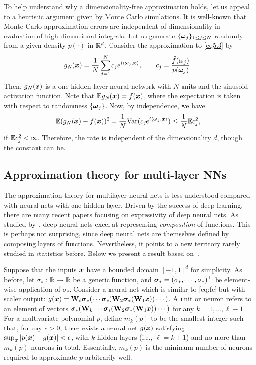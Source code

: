 To help understand why a dimensionality-free approximation holds, let us appeal to a heuristic argument given by Monte Carlo simulations. It is well-known that Monte Carlo approximation errors are independent of dimensionality in evaluation of high-dimensional integrals.  Let us generate $\{\text{\boldmath $\omega$}_j\}_{1\leq j \leq N}$ randomly from a given density $p(\cdot)$ in $\mathbb{R}^d$.  Consider the approximation to \eqref{eq5.3} by
\begin{equation} \label{eq5.4}
g_N(\text{\boldmath $x$}) = \frac{1}{N} \sum_{j=1}^N c_j e^{i \langle \text{\boldmath $\omega$}_j, \text{\boldmath $x$} \rangle}, \qquad c_j = \frac{\tilde f (\text{\boldmath $\omega$}_j)}{p(\text{\boldmath $\omega$}_j)}.
\end{equation}
Then, $g_N(\text{\boldmath $x$})$ is a one-hidden-layer neural network with $N$ units and the sinusoid activation function.  Note that $\mathbb{E} g_N(\text{\boldmath $x$}) = f(\text{\boldmath $x$})$, where the expectation is taken with respect to randomness $\{\text{\boldmath $\omega$}_j\}$.  Now, by independence, we have
$$
    \mathbb{E}( g_N(\text{\boldmath $x$}) - f(\text{\boldmath $x$}))^2 = \frac{1}{N} \mathrm{Var}(c_j e^{i \langle \text{\boldmath $\omega$}_j, \text{\boldmath $x$} \rangle})\leq   \frac{1}{N} \mathbb{E} c_j^2,
$$
if $\mathbb{E} c_j^2 < \infty$.  Therefore, the rate is independent of the dimensionality $d$, though the constant can be.




\subsection{Approximation theory for multi-layer NNs}
The approximation theory for multilayer neural nets is less understood compared with neural nets with one hidden layer. Driven by the success of deep learning, there are many recent papers focusing on expressivity of deep neural nets. As studied by~\cite{telgarsky2016benefits, eldan2016power, mhaskar2016learning, poggio2017and, bauer2017deep, schmidt2017nonparametric, lin2017does,rolnick2017power}, deep neural nets excel at representing \textit{composition} of functions. This is perhaps not surprising, since deep neural nets are themselves defined by composing layers of  functions. Nevertheless, it points to a new territory rarely studied in statistics before. Below we present a result based on~\cite{lin2017does,rolnick2017power}.

Suppose that the inputs $\text{\boldmath $x$}$ have a bounded domain $[-1,1]^d$ for simplicity. As before, let $\sigma_*: \mathbb{R} \to \mathbb{R}$ be a generic function, and $\bm{\sigma}_* = (\sigma_*, \cdots, \sigma_*)^\top$ be element-wise application of $\sigma_*$. Consider a neural net which is similar to \eqref{eq:fc} but with scaler output: $g(\text{\boldmath $x$}) = \mathrm{\bf W}_\ell \bm{\sigma}_*(\cdots \bm{\sigma}_*(\mathrm{\bf W}_2 \bm{\sigma}_*(\mathrm{\bf W}_1 \text{\boldmath $x$}))\cdots)$. A unit or neuron refers to an element of vectors $\bm{\sigma}_*(\mathrm{\bf W}_k \cdots \bm{\sigma}_*(\mathrm{\bf W}_2 \bm{\sigma}_*(\mathrm{\bf W}_1 \text{\boldmath $x$})) \cdots)$ for any $k=1,\ldots,\ell-1$. For a multivariate polynomial $p$, define $m_k(p)$ to be the smallest integer such that, for any $\epsilon > 0$, there exists a neural net $g(\text{\boldmath $x$})$ satisfying $\sup_{\text{\boldmath $x$}} \left| p(\text{\boldmath $x$}) - g(\text{\boldmath $x$}) \right| < \epsilon$, with $k$ hidden layers (i.e., $\ell = k+1$) and no more than $m_k(p)$ neurons in total. Essentially, $m_k(p)$ is the minimum number of neurons required to approximate $p$ arbitrarily well.

